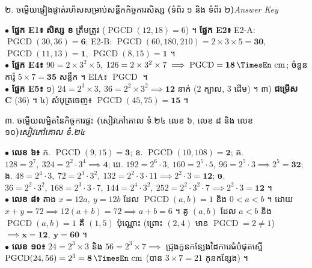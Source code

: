 \documentclass[a4paper,10pt]{article}
\newcommand{\en}[1]{{\TimesEn #1}}
\newcommand{\enbf}[1]{{\TimesEn\bfseries #1}}
\newcommand{\unit}[1]{\,\text{\en{#1}}}
\newcommand{\secstrip}[2]{%
  \vspace{3pt}%
  \begin{tcolorbox}[
    enhanced, sharp corners, colback=panelgray, colframe=black,
    boxrule=0.8pt, boxsep=0.8pt, top=2pt, bottom=2pt, left=5pt, right=5pt,
    after skip=3pt
  ]
    {\muol\fontsize{8.5pt}{12.2pt}\selectfont #1}\hfill{\fontsize{7.8pt}{10.8pt}\selectfont\textit{#2}}
  \end{tcolorbox}%
}
\begin{document}
\vfill
\secstrip{២. ចម្លើយផ្ទៀងផ្ទាត់រហ័សសម្រាប់សន្លឹកកិច្ចការសិស្ស \enbf{(}ទំព័រ ១ និង ទំព័រ ២\enbf{)}}{\en{Answer Key}}

\begin{tcolorbox}[
  enhanced, sharp corners, colback=white, colframe=black,
  boxrule=0.8pt, boxsep=2.5pt, top=4pt, bottom=4pt, left=6pt, right=6pt
]
  \fontsize{8.8pt}{12.9pt}\selectfont
  $\bullet$ \textbf{ផ្នែក \en{E1}៖} \textbf{សិស្ស ខ} ត្រឹមត្រូវ ($\operatorname{PGCD}(12,18)=6$) ។ \textbf{ផ្នែក \en{E2}៖} \en{E2-A}: $\operatorname{PGCD}(30,36)=\mathbf{6}$; \en{E2-B}: $\operatorname{PGCD}(60,180,210)=2\times 3\times 5=\mathbf{30}$, $\operatorname{PGCD}(11,13)=\mathbf{1}$, $\operatorname{PGCD}(8,15)=\mathbf{1}$ ។\\[2pt]
  $\bullet$ \textbf{ផ្នែក \en{E4}៖} $90=2\times 3^2\times 5$, $126=2\times 3^2\times 7 \implies \operatorname{PGCD}=\mathbf{18\unit{cm}}$; ចំនួនការ៉ូ $5\times 7 = \mathbf{35}$ សន្លឹក ។ \en{EIA}៖ $\operatorname{PGCD}$ ។\\[2pt]
  $\bullet$ \textbf{ផ្នែក \en{E5}៖} ១) $24=2^3\times 3,\ 36=2^2\times 3^2 \implies \mathbf{12}$ នាក់ ($2$ ក្បាល, $3$ ដើម) ។ ៣) \textbf{ជម្រើស \en{C}} ($36$) ។ ៤) សំបុត្រចេញ៖ $\operatorname{PGCD}(45,75)=\mathbf{15}$ ។
\end{tcolorbox}

\vfill
\secstrip{៣. ចម្លើយលម្អិតនៃកិច្ចការផ្ទះ \enbf{(}សៀវភៅគោល ទំ.២៤ លេខ ៦, លេខ ៨ និង លេខ ១០\enbf{)}}{សៀវភៅគោល ទំ.២៤}

\begin{tcolorbox}[
  enhanced, sharp corners, colback=white, colframe=black,
  boxrule=0.8pt, boxsep=2.5pt, top=4pt, bottom=4pt, left=6pt, right=6pt
]
  \fontsize{8.5pt}{12.5pt}\selectfont
  $\bullet$ \textbf{លេខ ៦៖} ក. $\operatorname{PGCD}(9,15)=\mathbf{3}$;\; ខ. $\operatorname{PGCD}(10,108)=\mathbf{2}$;\; គ. $128=2^7,\ 324=2^2\cdot 3^4 \implies \mathbf{4}$;\; ឃ. $192=2^6\cdot 3,\ 160=2^5\cdot 5,\ 96=2^5\cdot 3 \implies 2^5=\mathbf{32}$;\; ង. $48=2^4\cdot 3,\ 72=2^3\cdot 3^2,\ 132=2^2\cdot 3\cdot 11 \implies 2^2\cdot 3=\mathbf{12}$;\; ច. $36=2^2\cdot 3^2,\ 168=2^3\cdot 3\cdot 7,\ 144=2^4\cdot 3^2,\ 252=2^2\cdot 3^2\cdot 7 \implies 2^2\cdot 3=\mathbf{12}$ ។\\[2pt]
  $\bullet$ \textbf{លេខ ៨៖} តាង $x=12a,\ y=12b$ ដែល $\operatorname{PGCD}(a,b)=1$ និង $0<a<b$ ។ ដោយ $x+y=72 \implies 12(a+b)=72 \implies a+b=6$ ។ គូ $(a,b)$ ដែល $a<b$ និង $\operatorname{PGCD}(a,b)=1$ គឺ $(1, 5)$ ប៉ុណ្ណោះ (ព្រោះ $(2,4)$ មាន $\operatorname{PGCD}=2\ne 1$) $\implies \mathbf{x = 12,\ y = 60}$ ។\\[2pt]
  $\bullet$ \textbf{លេខ ១០៖} $24 = 2^3\times 3$ និង $56 = 2^3\times 7 \implies$ ជ្រុងកូនកន្សែងដៃការេធំបំផុតស្មើ $\operatorname{PGCD}(24, 56) = 2^3 = \mathbf{8\unit{cm}}$ (បាន $3\times 7 = 21$ កូនកន្សែង) ។
\end{tcolorbox}
\end{document}
